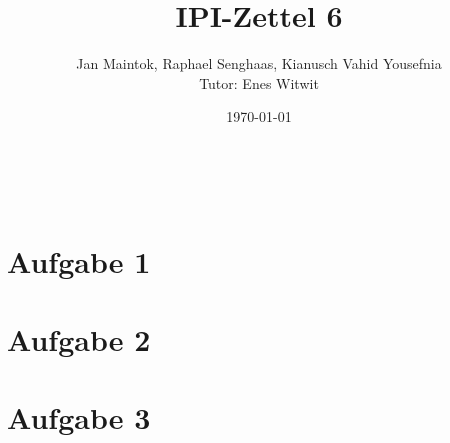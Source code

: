 \documentclass[11pt,a4paper,captions=tableheading]{scrartcl}
\title{IPI-Zettel 6}
\subtitle{Jan Maintok, Raphael Senghaas, Kianusch Vahid Yousefnia\\ Tutor: Enes Witwit}
\date{\today}
\makeatletter
\let\inserttitle\@title
\let\insertsubtitle\@subtitle
\makeatother
\begin{document}
\setcounter{page}{1}
\begin{center}
\vspace*{0pt}
{\huge \normalfont\sffamily \noindent\textbf{\inserttitle}}\\[0.6\baselineskip]
{\Large \normalfont\sffamily \noindent\textbf{\insertsubtitle}}
\end{center}
\vspace*{10pt}
\noindent

\section*{Aufgabe 1}

\section*{Aufgabe 2}

\section*{Aufgabe 3}

\end{document}
